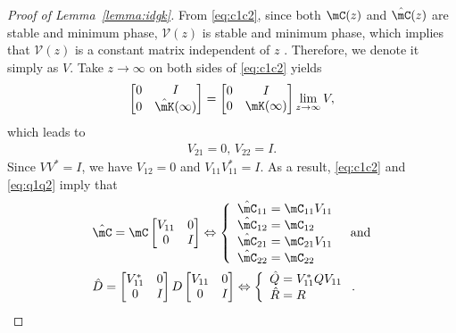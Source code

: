 \begin{proof}[Proof of Lemma~\ref{lemma:idgk}]
  From \eqref{eq:c1c2}, since both $\mC(z)$ and $\hat \mC(z)$ are stable and minimum phase, $\mathcal V(z)$ is stable and minimum phase, which implies that $\mathcal V(z)$ is a constant matrix independent of $z$ \cite{Anderson_1969, Hayden_2014}. Therefore, we denote it simply as $V$. Take $z\rightarrow\infty$ on both sides of \eqref{eq:c1c2} yields
  \begin{equation}
    \begin{bmatrix}
      0 & I \\
      0 & \hat \mK(\infty) 
    \end{bmatrix}= \begin{bmatrix}
      0 & I \\
      0 & \mK(\infty)
    \end{bmatrix}\lim_{z\rightarrow\infty}V,
  \end{equation}
  which leads to 
  \begin{align}
    V_{21}=0,\, V_{22}=I.
  \end{align}
  Since $VV^* = I$, we have $V_{12} = 0$ and $V_{11}V_{11}^* = I$. As a result, \eqref{eq:c1c2} and \eqref{eq:q1q2} imply that
  \begin{equation}
    \begin{aligned}
      &\hat\mC=\mC\begin{bmatrix}V_{11} & 0 \\ 0 & I \end{bmatrix}
      \Leftrightarrow\left\{
        \begin{array}{r@{\;=\;}l}
          \hat\mC_{11} & \mC_{11} V_{11}\\
          \hat\mC_{12} & \mC_{12} \\
          \hat\mC_{21} & \mC_{21}V_{11}\\ 
          \hat\mC_{22} & \mC_{22} 
        \end{array}
      \right. ~~\text{and}\\
      &\hat{D}=\begin{bmatrix}V^*_{11} & 0 \\ 0 & I \end{bmatrix}D\begin{bmatrix}V_{11} & 0 \\ 0 & I \end{bmatrix}
      \Leftrightarrow\left\{
        \begin{array}{r@{\;=\;}l}
          \hat{Q} & V^*_{11}QV_{11}\\
          \hat{R} & R
        \end{array}\right..

\end{aligned}
\end{equation}
\end{proof}
